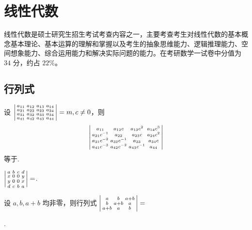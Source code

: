 \chapter{线性代数}
	线性代数是硕士研究生招生考试考查内容之一，主要考查考生对线性代数的基本概念基本理论、基本运算的理解和掌握以及考生的抽象思维能力、逻辑推理能力、空间想象能力、综合运用能力和解决实际问题的能力。在考研数学一试卷中分值为 $34$ 分，约占 $22\%$。
	\section{行列式}

	\begin{titwo}
		设 $\begin{vsmallmatrix}
			a_{11} & a_{12} & a_{13} & a_{14}\\
			a_{21} & a_{22} & a_{23} & a_{24}\\
			a_{31} & a_{32} & a_{33} & a_{34}\\
			a_{41} & a_{42} & a_{43} & a_{44}
		\end{vsmallmatrix} = m, c \ne 0$，则 
		\[
			\begin{vsmallmatrix}
				a_{11} & a_{12}c & a_{13}c^{2} & a_{14}c^{3}\\
				a_{21}c^{-1} & a_{22} & a_{23}c & a_{24}c^{2}\\
				a_{31}c^{-2} & a_{32}c^{-1} & a_{33} & a_{34}c\\
				a_{41}c^{-3} & a_{42}c^{-2} & a_{43}c^{-1} & a_{44}
			\end{vsmallmatrix}
		\]
		等于\kuo.

	\end{titwo}

	\begin{titwo}
		$\begin{vsmallmatrix}
			a & b & c & d \\
			x & 0 & 0 & y \\
			y & 0 & 0 & x \\
			d & c & b & a
		\end{vsmallmatrix} = $\htwo.
	\end{titwo}

	\begin{titwo}
		设 $a, b, a + b$ 均非零，则行列式 $\begin{vsmallmatrix}
			a & b & a + b \\
			b & a + b & a \\
			a + b & a & b \\
		\end{vsmallmatrix} = $
		
		\noindent\htwo.
	\end{titwo}

